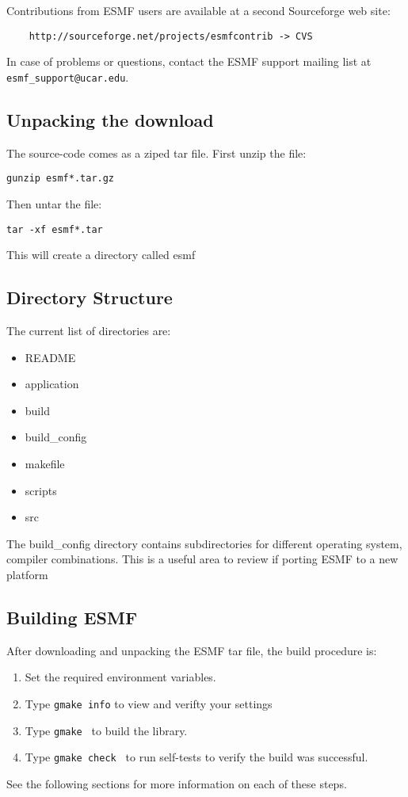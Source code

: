 Contributions from ESMF users are available at a second Sourceforge web site:
\begin{verbatim}
    http://sourceforge.net/projects/esmfcontrib -> CVS
\end{verbatim}
In case of problems or questions, contact the ESMF support mailing
list at {\tt esmf\_support@ucar.edu}.

\subsection{Unpacking the download}
The source-code comes as a ziped tar file. First unzip the file:
\begin{verbatim}
gunzip esmf*.tar.gz
\end{verbatim}

Then untar the file:
\begin{verbatim}
tar -xf esmf*.tar
\end{verbatim}

This will create a directory called esmf


\subsection{Directory Structure}
The current list of directories are:
\begin{itemize}
\item README
\item application
\item build
\item build_config
\item makefile
\item scripts
\item src
\end{itemize}

The build_config directory contains subdirectories for different operating system, compiler combinations. This is
a useful area to review if porting ESMF to a new platform




\subsection{Building ESMF}

After downloading and unpacking the ESMF tar file, the build procedure is:
\begin{enumerate}
\item Set the required environment variables. 
\item Type {\tt gmake info} to view and verifty your settings
\item Type {\tt gmake } to build the library.
\item Type {\tt gmake check } to run self-tests to verify
the build was successful.
\end{enumerate}
See the following sections for more information on each of these steps.


